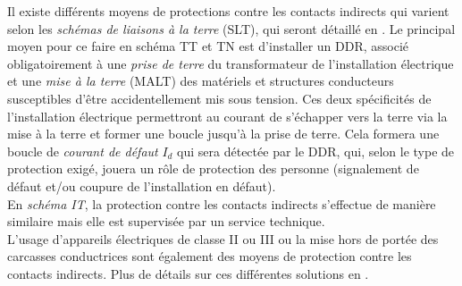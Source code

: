 Il existe différents moyens de protections contre les contacts indirects qui varient selon les \emph{schémas de liaisons à la terre} (SLT), qui seront détaillé en . Le principal moyen pour ce faire en schéma TT et TN est d'installer un DDR, associé obligatoirement à une \emph{prise de terre} du transformateur de l'installation électrique et une \emph{mise à la terre} (MALT) des matériels et structures conducteurs susceptibles d'être accidentellement mis sous tension. Ces deux spécificités de l'installation électrique permettront au courant de s'échapper vers la terre via la mise à la terre et former une boucle jusqu'à la prise de terre. Cela formera une boucle de \emph{courant de défaut} $I_d$ qui sera détectée par le DDR, qui, selon le type de protection exigé, jouera un rôle de protection des personne (signalement de défaut et/ou coupure de l'installation en défaut).\\
En \emph{schéma IT}, la protection contre les contacts indirects s'effectue de manière similaire mais elle est supervisée par un service technique.\\

L'usage d'appareils électriques de classe II ou III ou la mise hors de portée des carcasses conductrices sont également des moyens de protection contre les contacts indirects. Plus de détails sur ces différentes solutions en . 


%
